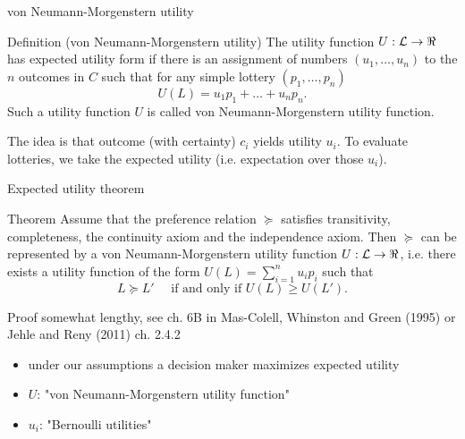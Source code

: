 \documentclass[bigger]{beamer}
\begin{document}
\begin{frame}[label={sec:orgde6ff7d}]{von Neumann-Morgenstern utility}
\begin{block}{Definition (von Neumann-Morgenstern utility)}
   The utility function \(U:\mathcal{L}\rightarrow \Re\) has expected utility form if there is an assignment of numbers \((u_1,\dots,u_n)\) to the \(n\) outcomes in \(C\) such that for any simple lottery \((p_1,\dots,p_n)\) 
$$U(L)=u_1 p_1+\dots+u_n p_n.$$
Such a utility function \(U\) is called von Neumann-Morgenstern utility function.
\end{block}

The idea is that outcome (with certainty) \(c_i\) yields utility \(u_i\). To evaluate lotteries, we take the expected utility (i.e. expectation over those \(u_i\)).
\end{frame}

\begin{frame}[label={sec:org27c5d9d}]{Expected utility theorem}
\begin{block}{Theorem}
Assume that the preference relation \(\succeq\) satisfies transitivity, completeness, the continuity axiom and the independence axiom. Then \(\succeq\) can be represented by a von Neumann-Morgenstern utility function \(U: \mathcal{L}\rightarrow \Re\), i.e. there exists a utility function of the form \(U(L)=\sum_{i=1}^nu_i p_i\) such that
$$ L\succeq L' \quad\text{ if and only if }U(L)\geq U(L').$$
\end{block}

\begin{block}{Proof}
somewhat lengthy, see ch. 6B in Mas-Colell, Whinston and Green (1995) or Jehle and Reny (2011) ch. 2.4.2
\end{block}

\begin{itemize}
\item under our assumptions a decision maker maximizes expected utility
\item \(U\): "von Neumann-Morgenstern utility function"
\item \(u_i\): "Bernoulli utilities"
\end{itemize}
\end{frame}
\end{document}
